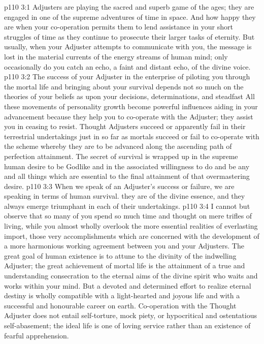 \vs p110 3:1 Adjusters are playing the sacred and superb game of the ages; they are engaged in one of the supreme adventures of time in space. And how happy they are when your co\hyp{}operation permits them to lend assistance in your short struggles of time as they continue to prosecute their larger tasks of eternity. But usually, when your Adjuster attempts to communicate with you, the message is lost in the material currents of the energy streams of human mind; only occasionally do you catch an echo, a faint and distant echo, of the divine voice.
\vs p110 3:2 The success of your Adjuster in the enterprise of piloting you through the mortal life and bringing about your survival depends not so much on the theories of your beliefs as upon your decisions, determinations, and steadfast  All these movements of personality growth become powerful influences aiding in your advancement because they help you to co\hyp{}operate with the Adjuster; they assist you in ceasing to resist. Thought Adjusters succeed or apparently fail in their terrestrial undertakings just in so far as mortals succeed or fail to co\hyp{}operate with the scheme whereby they are to be advanced along the ascending path of perfection attainment. The secret of survival is wrapped up in the supreme human desire to be Godlike and in the associated willingness to do and be any and all things which are essential to the final attainment of that overmastering desire.
\vs p110 3:3 When we speak of an Adjuster’s success or failure, we are speaking in terms of human survival.  they are of the divine essence, and they always emerge triumphant in each of their undertakings.
\vs p110 3:4 \pc I cannot but observe that so many of you spend so much time and thought on mere trifles of living, while you almost wholly overlook the more essential realities of everlasting import, those very accomplishments which are concerned with the development of a more harmonious working agreement between you and your Adjusters. The great goal of human existence is to attune to the divinity of the indwelling Adjuster; the great achievement of mortal life is the attainment of a true and understanding consecration to the eternal aims of the divine spirit who waits and works within your mind. But a devoted and determined effort to realize eternal destiny is wholly compatible with a light\hyp{}hearted and joyous life and with a successful and honourable career on earth. Co\hyp{}operation with the Thought Adjuster does not entail self\hyp{}torture, mock piety, or hypocritical and ostentatious self\hyp{}abasement; the ideal life is one of loving service rather than an existence of fearful apprehension.

